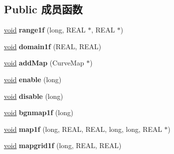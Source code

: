 \subsection*{Public 成员函数}
\begin{DoxyCompactItemize}
\item 
\mbox{\label{class_open_g_l_curve_evaluator_a7f7f2856a1fcdaf2622238e8e35f22f6}} 
\hyperlink{interfacevoid}{void} {\bfseries range1f} (long, R\+E\+AL $\ast$, R\+E\+AL $\ast$)
\item 
\mbox{\label{class_open_g_l_curve_evaluator_ae27a5f87d93486c7a23aba9201a35731}} 
\hyperlink{interfacevoid}{void} {\bfseries domain1f} (R\+E\+AL, R\+E\+AL)
\item 
\mbox{\label{class_open_g_l_curve_evaluator_a4fbd5957b499ff5c621a8e8ded06fb45}} 
\hyperlink{interfacevoid}{void} {\bfseries add\+Map} (Curve\+Map $\ast$)
\item 
\mbox{\label{class_open_g_l_curve_evaluator_a51c701311543fa649f3129c435512c4f}} 
\hyperlink{interfacevoid}{void} {\bfseries enable} (long)
\item 
\mbox{\label{class_open_g_l_curve_evaluator_a53131cdfa268f07cc5017f93a3a486d9}} 
\hyperlink{interfacevoid}{void} {\bfseries disable} (long)
\item 
\mbox{\label{class_open_g_l_curve_evaluator_a648d0e87fd804a67e150303a6556e612}} 
\hyperlink{interfacevoid}{void} {\bfseries bgnmap1f} (long)
\item 
\mbox{\label{class_open_g_l_curve_evaluator_aa916b8ecc453cbd3874d09604fdedebf}} 
\hyperlink{interfacevoid}{void} {\bfseries map1f} (long, R\+E\+AL, R\+E\+AL, long, long, R\+E\+AL $\ast$)
\item 
\mbox{\label{class_open_g_l_curve_evaluator_ab1b8e930ed84ea9d6ea7da7173f53917}} 
\hyperlink{interfacevoid}{void} {\bfseries mapgrid1f} (long, R\+E\+AL, R\+E\+AL)
\item 
\mbox{\label{class_open_g_l_curve_evaluator_aef4545353c69e69d0a6993b4c4a96e25}} 

\end{DoxyCompactItemize}

